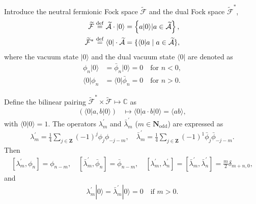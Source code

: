 \documentclass[11pt,reqno]{amsart}
\numberwithin{equation}{section}
\begin{document}
	Introduce the neutral fermionic Fock space $\mathcal{\widetilde{F}}$ and the dual Fock space $\mathcal{\widetilde{F}}^{*}$,
	\begin{align}
		\mathcal{\widetilde{F}}&\stackrel{\mathrm{def}}{=}\widetilde{\mathcal{A}}\cdot| 0\rangle=\left\{a| 0\rangle|a\in\widetilde{\mathcal{A}}\right\},\notag\\
		\mathcal{\widetilde{F}}^{*}&\stackrel{\mathrm{def}}{=}\langle0|\cdot\widetilde{\mathcal{A}}=\{\langle0|a\mid a\in\widetilde{\mathcal{A}}\},
	\end{align}
	where the vacuum state $|0\rangle$ and the dual vacuum state $\langle0|$ are  denoted as
	\begin{align}
		\phi_n|0\rangle&=\bar{\phi}_n|0\rangle=0\quad\text{for } n<0,\\
		\langle0|\phi_n&=\langle0|\bar{\phi}_n=0\quad\text{for } n>0.
	\end{align}
	
	
	Define the  bilinear pairing  $\mathcal{\widetilde{F}}^*\times\mathcal{\widetilde{F}}\longmapsto  \mathbb{C}$ as
	\begin{align}
		(\langle0|a,b|0\rangle)  &\longmapsto  \langle0|a\cdot b|0\rangle=\langle ab\rangle,
	\end{align}
	with $\langle0|0\rangle=1$.
	The operators $\lambda_{m}^{'}$ and $\bar{\lambda}_{m}^{'}$ ($m\in\mathbf{N}_{\mathrm{odd}}$) are expressed as
	\begin{align}
		 \lambda_{m}^{'}=\frac{1}{4}\sum_{j\in\mathbf{Z}}(-1)^{j}\phi_{j}\phi_{-j-m},\quad\bar{\lambda}_{m}^{'}=\frac{1}{4}\sum_{j\in\mathbf{Z}}(-1)^{1}\bar{\phi}_{j}\bar{\phi}_{-j-m}.
	\end{align}
	Then
	\begin{align}\label{commutation relations 2.2}
		[\lambda_{m}^{'},\phi_{n}]=\phi_{n-m},\quad[\bar{\lambda}_{m}^{'},\bar{\phi}_{n}]=\bar{\phi}_{n-m},\quad
		[\lambda_{m}^{'},\lambda^{'}_{n}]=[\bar{\lambda}_{m}^{'},\bar{\lambda}^{'}_{n}]=\frac{m}{2}\delta_{m+n,0},
	\end{align}
	and
	\begin{align}
		\lambda^{'}_m|0\rangle=\bar{\lambda}^{'}_m|0\rangle=0\quad\text{if } m>0.
	\end{align}
	
\end{document}
